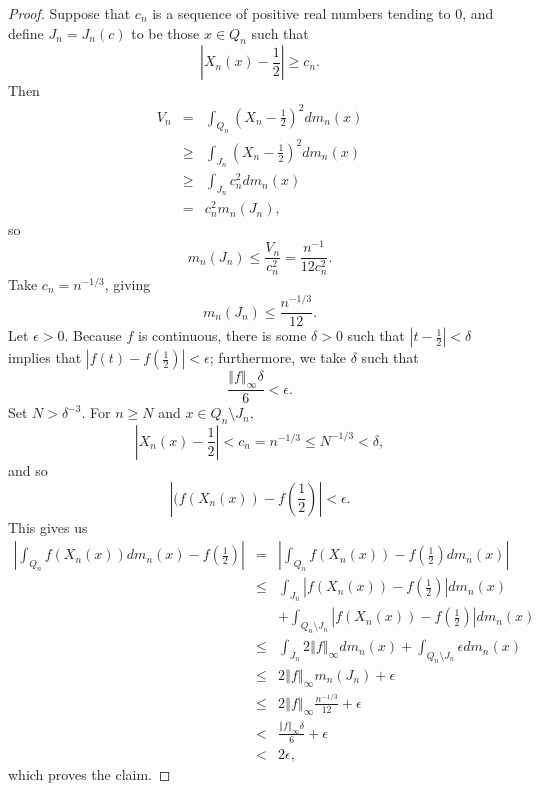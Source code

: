 \documentclass{article}
\newcommand{\norm}[1]{\left\Vert #1 \right\Vert}
\theoremstyle{definition}
\begin{document}
\begin{proof}
Suppose that $c_n$ is a sequence of positive real numbers tending to $0$, and define $J_n=J_n(c)$ to be those $x \in Q_n$ such that
\[
\left|X_n(x)-\frac{1}{2} \right| \geq c_n.
\]
Then
\begin{eqnarray*}
V_n &=& \int_{Q_n} \left(X_n-\frac{1}{2} \right)^2 dm_n(x)\\
&\geq& \int_{J_n} \left(X_n-\frac{1}{2} \right)^2 dm_n(x)\\
&\geq& \int_{J_n} c_n^2 dm_n(x)\\
&=&c_n^2 m_n(J_n),
\end{eqnarray*}
so
\[
m_n(J_n) \leq \frac{V_n}{c_n^2} = \frac{n^{-1}}{12c_n^2}. 
\]
Take $c_n=n^{-1/3}$, giving
\[
m_n(J_n) \leq \frac{n^{-1/3}}{12}.
\]
Let $\epsilon>0$.
Because $f$ is continuous, there is some $\delta>0$ such that $|t-\frac{1}{2}|<\delta$ implies that
$|f(t)-f(\frac{1}{2})|<\epsilon$; furthermore, we take $\delta$ such that
\[
\frac{\norm{f}_\infty \delta}{6}<\epsilon.
\]
Set $N>\delta^{-3}$. For $n \geq N$ and $x \in Q_n \setminus J_n$,
\[
\left|X_n(x)-\frac{1}{2}\right| < c_n=n^{-1/3} \leq N^{-1/3} < \delta,
\]
and so
\[
\left|(f(X_n(x))-f\left(\frac{1}{2}\right)\right|<\epsilon.
\]
This gives us
\begin{eqnarray*}
\left| \int_{Q_n} f(X_n(x))  dm_n(x)- f\left(\frac{1}{2}\right) \right|&=&
\left|   \int_{Q_n} f(X_n(x)) - f\left(\frac{1}{2}\right) dm_n(x) \right|\\
&\leq& \int_{J_n} \left|f(X_n(x)) - f\left(\frac{1}{2}\right)\right| dm_n(x)\\
&&+\int_{Q_n \setminus J_n}  \left|f(X_n(x)) - f\left(\frac{1}{2}\right)\right| dm_n(x)\\
&\leq& \int_{J_n}2\norm{f}_\infty dm_n(x)
+\int_{Q_n \setminus J_n} \epsilon dm_n(x)\\
&\leq&2\norm{f}_\infty m_n(J_n)+\epsilon\\
&\leq&2\norm{f}_\infty  \frac{n^{-1/3}}{12} + \epsilon\\
&<&\frac{\norm{f}_\infty \delta}{6}+\epsilon\\
&<&2\epsilon,
\end{eqnarray*}
which proves the claim.
\end{proof}
\end{document}
